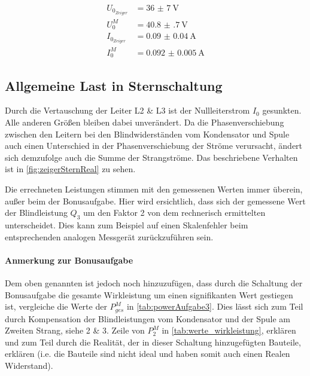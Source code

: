 \documentclass[12pt,english,ngerman]{scrartcl}
\begin{document}
\begin{align*}
	U_{0_{Zeiger}} & = \SI{36(7)}{\volt}      \\
	U_{0}^M        & = \SI{40.8(7)}{\volt}    \\
	I_{0_{Zeiger}} & = \SI{0.09(4)}{\ampere}  \\
	I_{0}^M        & = \SI{0.092(5)}{\ampere}
\end{align*}

\subsection{Allgemeine Last in Sternschaltung}

Durch die Vertauschung der Leiter L2 \& L3 ist der Nullleiterstrom $I_0$
gesunkten. Alle anderen Größen bleiben dabei unverändert. Da die
Phasenverschiebung zwischen den Leitern bei den Blindwiderständen vom
Kondensator und Spule auch einen Unterschied in der Phasenverschiebung der
Ströme verursacht, ändert sich demzufolge auch die Summe der Strangströme. Das
beschriebene Verhalten ist in \autoref{fig:zeigerSternReal} zu sehen.

Die errechneten Leistungen stimmen mit den gemessenen Werten immer überein,
außer beim der Bonusaufgabe. Hier wird ersichtlich, dass sich der gemessene
Wert der Blindleistung $Q_3$ um den Faktor 2 von dem rechnerisch ermittelten
unterscheidet. Dies kann zum Beispiel auf einen Skalenfehler beim
entsprechenden analogen Messgerät zurückzuführen sein.

\paragraph{Anmerkung zur Bonusaufgabe}Dem oben genannten ist jedoch noch hinzuzufügen, dass durch die Schaltung der
Bonusaufgabe die gesamte Wirkleistung um einen signifikanten Wert gestiegen
ist, vergleiche die Werte der $P_{ges}^M$ in \autoref{tab:powerAufgabe3}. Dies
lässt sich zum Teil durch Kompensation der Blindleistungen vom Kondensator und
der Spule am Zweiten Strang, siehe 2 \& 3. Zeile von $P_2^M$ in
\autoref{tab:werte_wirkleistung}, erklären und zum Teil durch die Realität, der
in dieser Schaltung hinzugefügten Bauteile, erklären (i.e. die Bauteile sind
nicht ideal und haben somit auch einen Realen Widerstand).
\end{document}
